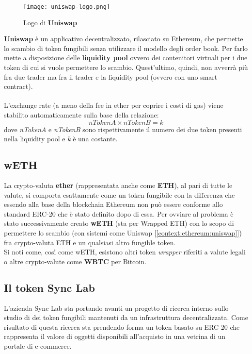     \begin{figure}[h!]
        \centering
        \texttt{[image: uniswap-logo.png]}
        \caption{Logo di \textbf{Uniswap}}
    \end{figure}

    \textbf{Uniswap} è un applicativo decentralizzato, rilasciato su Ethereum, che permette lo scambio di token fungibili senza utilizzare il modello degli order book. Per farlo mette a disposizione delle \textbf{liquidity pool} ovvero dei contenitori virtuali per i due token di cui si vuole permettere lo scambio. Quest'ultimo, quindi, non avverrà più fra due trader ma fra il trader e la liquidity pool (ovvero con uno smart contract).
    \\\\
    L'exchange rate (a meno della fee in ether per coprire i costi di gas) viene stabilito automaticamente sulla base della relazione:
    \[
    nTokenA \times nTokenB = k
    \]
    dove \textit{nTokenA} e \textit{nTokenB} sono rispettivamente il numero dei due token presenti nella liquidity pool e \textit{k} è una costante.

    \subsection{wETH}
    La crypto-valuta \textbf{ether} (rappresentata anche come \textbf{ETH}), al pari di tutte le valute, si comporta esattamente come un token fungibile con la differenza che essendo alla base della blockchain Ethereum non può essere conforme allo standard ERC-20 che è stato definito dopo di essa. Per ovviare al problema è stato successivamente creato \textbf{wETH} (sta per Wrapped ETH) con lo scopo di permettere lo scambio (con sistemi come Uniswap [\autoref{context:ethereum:uniswap}]) fra crypto-valuta ETH e un qualsiasi altro fungible token.\\
    Si noti come, così come wETH, esistono altri token \textit{wrapper} riferiti a valute legali o altre crypto-valute come \textbf{WBTC} per Bitcoin.

    \subsection{Il token Sync Lab}
    L'azienda Sync Lab sta portando avanti un progetto di ricerca interno sullo studio di dei token fungibili mantenuti da un infrastruttura decentralizzata. Come risultato di questa ricerca sta prendendo forma un token basato su ERC-20 che rappresenta il valore di oggetti disponibili all'acquisto in una vetrina di un portale di e-commerce.

